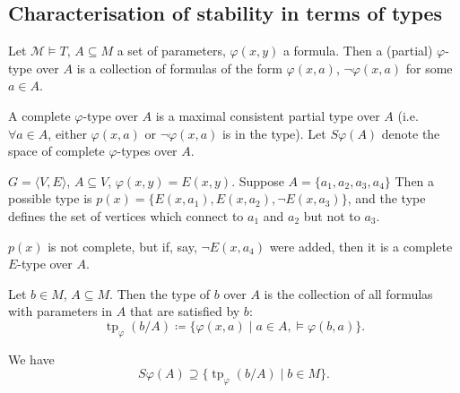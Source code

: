 \documentclass{article}
\let\models\vDash
\DeclareMathOperator{\tp}{tp}
\begin{document}
\subsection{Characterisation of stability in terms of types}
\begin{defi}
  Let $\mathscr{M} \models T$, $A \subseteq M$ a set of parameters, $\varphi(x,y)$ a formula.
  Then a (partial) $\varphi$-type over $A$ is a collection of formulas of the form $\varphi(x,a)$, $\neg \varphi(x,a)$ for some $a \in A$.
\end{defi}
\begin{defi}
  A complete $\varphi$-type over $A$ is a maximal consistent partial type over $A$ (i.e.\ $\forall a \in A$, either $\varphi(x,a)$ or $\neg \varphi(x,a)$ is in the type).
  Let $S \varphi(A)$ denote the space of complete $\varphi$-types over $A$.
\end{defi}
\begin{eg}
  $G = \langle V,E \rangle$, $A \subseteq V$, $\varphi(x,y) = E(x,y)$. Suppose $A = \{a_1,a_2,a_3,a_4\}$
  Then a possible type is $p(x) = \{E(x,a_1), E(x,a_2), \neg E(x,a_3)\}$, and the type defines the set of vertices which connect to $a_1$ and $a_2$ but not to $a_3$.
  \begin{center}
  \end{center}
  $p(x)$ is not complete, but if, say, $\neg E(x,a_4)$ were added, then it is a complete $E$-type over $A$.
\end{eg}
\begin{defi}
  Let $b \in M$, $A \subseteq M$. Then the type of $b$ over $A$ is the collection of all formulas with parameters in $A$ that are satisfied by $b$:
  \begin{equation*}
    \tp_\varphi(b/A) \coloneqq \{\varphi(x,a) \mid a \in A, \models \varphi(b,a)\}.
  \end{equation*}
\end{defi}
We have
\begin{equation*}
  S\varphi(A) \supseteq \{\tp_\varphi(b/A) \mid b \in M\}.
\end{equation*}
\end{document}
